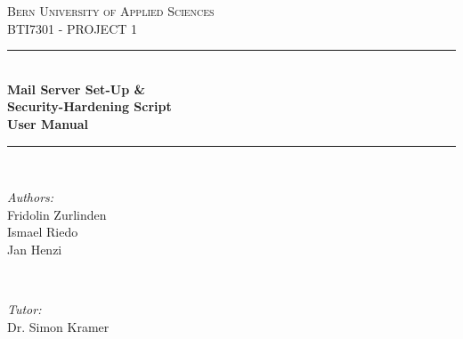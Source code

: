 	\begin{titlepage}\sffamily
		
		\newcommand{\HRule}{\rule{\linewidth}{0.5mm}} %
		
		\center %
		
		
		\textsc{\LARGE Bern University of Applied Sciences}\\[1.5cm] %
		\textsc{\Large BTI7301 - PROJECT 1}\\[0.5cm] %
		
		
		\HRule \\[0.4cm]
		{ \huge \bfseries Mail Server Set-Up \& \\ Security-Hardening Script}\\[0.4cm] %
		{ \Large \bfseries User Manual}\\[0.4cm] %
		\HRule \\[1.5cm]
		
		
		\begin{minipage}{0.4\textwidth}
			\begin{flushleft} \large
				\emph{Authors:}\\
				Fridolin Zurlinden \\ Ismael Riedo \\ Jan Henzi
			\end{flushleft}
		\end{minipage}
		~
		\begin{minipage}{0.4\textwidth}
			\begin{flushright} \large
				\emph{Tutor:} \\
				Dr. Simon Kramer \\
			\end{flushright}
		\end{minipage}\\[2cm]
        

\end{titlepage}
